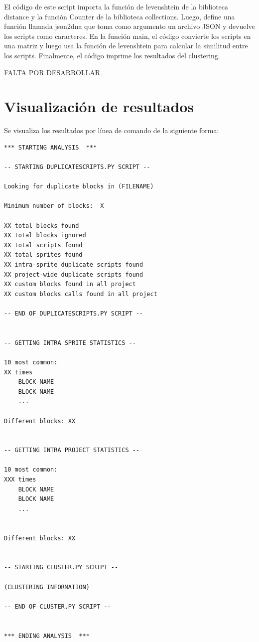 \documentclass[a4paper, 12pt]{book}
\begin{document}
El código de este script importa la función de levenshtein de la biblioteca distance y la función Counter de la biblioteca collections. Luego, define una función llamada json2dna que toma como argumento un archivo JSON y devuelve los scripts como caracteres. En la función main, el código convierte los scripts en una matriz y luego usa la función de levenshtein para calcular la similitud entre los scripts. Finalmente, el código imprime los resultados del clustering.

FALTA POR DESARROLLAR.

\section{Visualización de resultados} 
\label{sec:visualizacionresultados}

Se visualiza los resultados por línea de comando de la siguiente forma:

\begin{lstlisting}[style=consola,numbers=none]
*** STARTING ANALYSIS  ***

-- STARTING DUPLICATESCRIPTS.PY SCRIPT --

Looking for duplicate blocks in (FILENAME)

Minimum number of blocks:  X

XX total blocks found
XX total blocks ignored
XX total scripts found
XX total sprites found
XX intra-sprite duplicate scripts found
XX project-wide duplicate scripts found
XX custom blocks found in all project
XX custom blocks calls found in all project

-- END OF DUPLICATESCRIPTS.PY SCRIPT --


-- GETTING INTRA SPRITE STATISTICS --

10 most common:
XX times
	BLOCK NAME 
	BLOCK NAME
	...

Different blocks: XX


-- GETTING INTRA PROJECT STATISTICS --

10 most common:
XXX times
	BLOCK NAME
	BLOCK NAME
	...


Different blocks: XX


-- STARTING CLUSTER.PY SCRIPT --

(CLUSTERING INFORMATION)

-- END OF CLUSTER.PY SCRIPT --


*** ENDING ANALYSIS  ***


\end{lstlisting}

\end{document}
